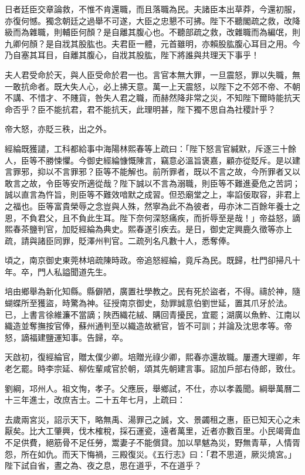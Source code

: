 \begin{pinyinscope}
日者廷臣交章論救，不惟不肯還職，而且落職為民。夫諸臣本出草莽，今還初服，亦復何憾。獨念朝廷之過舉不可遂，大臣之忠懇不可拂。陛下不聽閣疏之救，改降級而為雜職，則輔臣何顏？是自離其腹心也。不聽部疏之救，改雜職而為編氓，則九卿何顏？是自戕其股肱也。夫君臣一體，元首雖明，亦賴股肱腹心耳目之用。今乃自塞其耳目，自離其腹心，自戕其股肱，陛下將誰與共理天下事乎！

夫人君受命於天，與人臣受命於君一也。言官本無大罪，一旦震怒，罪以失職，無一敢抗命者。既大失人心，必上拂天意。萬一上天震怒，以陛下之不郊不帝、不朝不講、不惜才、不賤貨，咎失人君之職，而赫然降非常之災，不知陛下爾時能抗天命否乎？臣不能抗君，君不能抗天，此理明甚，陛下獨不思自為社稷計乎？

帝大怒，亦貶三秩，出之外。

經綸既獲譴，工科都給事中海陽林熙春等上疏曰：「陛下怒言官緘默，斥逐三十餘人，臣等不勝悚懼。今御史經綸慷慨陳言，竊意必溫旨褒嘉，顧亦從貶斥。是以建言罪邪，抑以不言罪邪？臣等不能解也。前所罪者，既以不言之故，今所罪者又以敢言之故，令臣等安所適從哉？陛下誠以不言為溺職，則臣等不難進憂危之苦詞；誠以直言為忤旨，則臣等不難效喑默之成習。但恐廟堂之上，率諂佞取容，非君上之福也。臣等富貴榮辱之念豈與人殊，然寧為此不為彼者，毋亦沐二百餘年養士之恩，不負君父，且不負此生耳。陛下奈何深怒痛疾，而折辱至是哉！」帝益怒，謫熙春茶鹽判官，加貶經綸為典史。熙春遂引疾去。是日，御史定興鹿久徵等亦上疏，請與諸臣同罪，貶澤州判官。二疏列名凡數十人，悉奪俸。

頃之，南京御史東莞林培疏陳時政。帝追怒經綸，竟斥為民。既歸，杜門卻掃凡十年。卒，門人私謚聞道先生。

培由鄉舉為新化知縣。縣僻陋，廣置社學教之。民有死於盜者，不得。禱於神，隨蝴蝶所至獲盜，時驚為神。征授南京御史，劾罪誠意伯劉世延，置其爪牙於法。已，上書言徐維濂不當謫；陜西織花絨、購回青擾民，宜罷；湖廣以魚鮓、江南以織造並奪撫按官俸，蘇州通判至以織造故褫官，皆不可訓；并論及沈思孝等。帝怒，謫福建鹽運知事。告歸，卒。

天啟初，復經綸官，贈太僕少卿。培贈光祿少卿，熙春亦還故職。屢遷大理卿，年老乞罷。時李宗延、柳佐輩咸官於朝，頌其先朝建言事。詔加戶部右侍郎，致仕。

劉綱，邛州人。祖文恂，孝子。父應辰，舉鄉試，不仕，亦以孝義聞。綱舉萬曆二十三年進士，改庶吉士。二十五年七月，上疏曰：

去歲兩宮災，詔示天下，略無禹、湯罪己之誠，文、景蠲租之惠，臣已知天心之未厭矣。比大工肇興，伐木榷稅，採石運瓷，遠者萬里，近者亦數百里。小民竭膏血不足供費，絕筋骨不足任勞，鬻妻子不能償貸。加以旱魃為災，野無青草，人情胥怨，所在如仇。而天下悔禍，三殿復災。《五行志》曰：「君不思道，厥災燒宮。」陛下試自省，晝之為、夜之息，思在道乎，不在道乎？


\end{pinyinscope}
